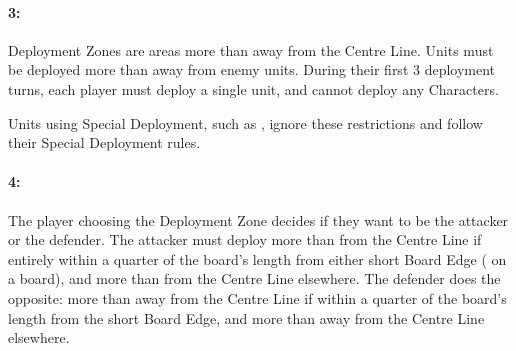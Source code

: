 \vspace*{5pt}
\begin{minipage}{0.67\textwidth}
\idx[main=y]{\counterthrust}\hypertarget{counterthrust}{\paragraph{3\spacebeforecolon{}: \counterthrust}}
\vspace*{0.5ex}

Deployment Zones are areas more than  away from the Centre Line. Units must be deployed more than  away from enemy units. During their first 3 deployment turns, each player must deploy a single unit, and cannot deploy any Characters.

Units using Special Deployment, such as \hyperref[scout]{\scout}, ignore these restrictions and follow their Special Deployment rules.
\end{minipage}\hfill\begin{minipage}{0.275\textwidth}
\def\svgwidth{\textwidth}

\end{minipage}\hspace*{0.022\textwidth}

\vspace*{5pt}
\begin{minipage}{0.67\textwidth}
\idx[main=y]{\encircle}\hypertarget{encircle}{\paragraph{4\spacebeforecolon{}: \encircle}}
\vspace*{0.5ex}

The player choosing the Deployment Zone decides if they want to be the attacker or the defender. The attacker must deploy more than  from the Centre Line if entirely within a quarter of the board's length from either short Board Edge ( on a  board), and more than  from the Centre Line elsewhere. The defender does the opposite: more than  away from the Centre Line if within a quarter of the board's length from the short Board Edge, and more than  away from the Centre Line elsewhere.
\end{minipage}\hfill\begin{minipage}{0.275\textwidth}
\def\svgwidth{\textwidth}
\def\deploymentfigAttacker{Attacker}
\def\deploymentfigDefender{Defender}

\end{minipage}\hspace*{0.022\textwidth}


